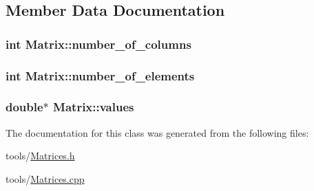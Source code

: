 \subsection{Member Data Documentation}
\hypertarget{classMatrix_afd4ab1ffa8fadfcaae4ebcf7802c0fef}{
\subsubsection[{number\-\_\-of\-\_\-columns}]{\setlength{\rightskip}{0pt plus 5cm}int Matrix\-::number\-\_\-of\-\_\-columns\hspace{0.3cm}{\ttfamily [private]}}}\label{classMatrix_afd4ab1ffa8fadfcaae4ebcf7802c0fef}
\hypertarget{classMatrix_ad88772bca79eec502f3737b027431c60}{
\subsubsection[{number\-\_\-of\-\_\-elements}]{\setlength{\rightskip}{0pt plus 5cm}int Matrix\-::number\-\_\-of\-\_\-elements\hspace{0.3cm}{\ttfamily [private]}}}\label{classMatrix_ad88772bca79eec502f3737b027431c60}
\hypertarget{classMatrix_a19505b0b139553ad1ee2291f3d8385a9}{
\subsubsection[{values}]{\setlength{\rightskip}{0pt plus 5cm}double$\ast$ Matrix\-::values\hspace{0.3cm}{\ttfamily [private]}}}\label{classMatrix_a19505b0b139553ad1ee2291f3d8385a9}


The documentation for this class was generated from the following files\-:\begin{DoxyCompactItemize}
\item 
tools/\hyperlink{Matrices_8h}{Matrices.\-h}\item 
tools/\hyperlink{Matrices_8cpp}{Matrices.\-cpp}\end{DoxyCompactItemize}

